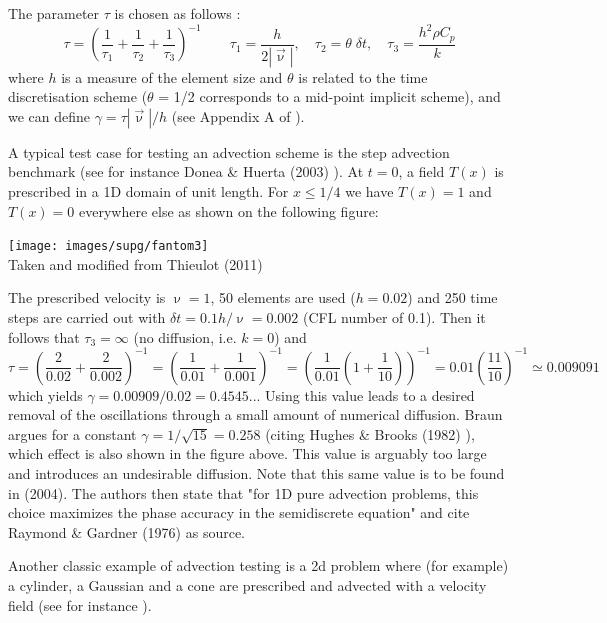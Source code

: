 The parameter $\tau$ is chosen as follows \cite{teos00}:
\begin{equation}
\tau= \left(\frac{1}{\tau_1} + \frac{1}{\tau_2} + \frac{1}{\tau_3} \right)^{-1}
\qquad
\tau_1=\frac{h}{2 |\vec\upnu|},
\quad
\tau_2 = \theta \; \delta t,
\quad
\tau_3 = \frac{h^2 \rho C_p}{k}
\label{tausupg}
\end{equation}
where $h$ is a measure of the element size and $\theta$ is related to the time
discretisation scheme ($\theta$ = 1/2 corresponds to a mid-point implicit scheme),
and we can define $\gamma=\tau |\vec\upnu|/h$ (see Appendix A of \cite{thie11}). 

A typical test case for testing an advection scheme is the step advection benchmark 
(see for instance Donea \& Huerta (2003) \cite{dohu03}). At $t=0$, 
a field $T(x)$ is prescribed in a 1D domain of unit length. For $x\le 1/4$ we have $T(x)=1$ and 
$T(x)=0$ everywhere else as shown on the following figure:
\begin{center}
\texttt{[image: images/supg/fantom3]}\\
{\captionfont Taken and modified from Thieulot (2011) \cite{thie11}}
\end{center}
The prescribed velocity is $\upnu=1$, 50 elements are used ($h=0.02$) and 250 time steps are 
carried out with $\delta t=0.1h/\upnu=0.002$ (CFL number of 0.1).
Then it follows that $\tau_3=\infty$ (no diffusion, i.e. $k=0$) and 
\[
\tau
= \left(\frac{2}{0.02} + \frac{2}{0.002} \right)^{-1}
= \left(\frac{1}{0.01} + \frac{1}{0.001} \right)^{-1}
= \left(\frac{1}{0.01} (1 + \frac{1}{10})  \right)^{-1}
= 0.01 \left(\frac{11}{10}  \right)^{-1}
\simeq 0.009091
\]
which yields $\gamma = 0.00909/0.02=0.4545...$
Using this value leads to a desired removal of the oscillations through a small
amount of numerical diffusion. Braun \cite{brau03} argues for a constant
$\gamma=1/\sqrt{15}=0.258$ (citing Hughes \& Brooks (1982) \cite{hubr82}), 
which effect is also shown in the figure above. This 
value is arguably too large and introduces an undesirable diffusion. Note that this same value is 
to be found in \textcite{bogs04} (2004). The authors then state that 
"for 1D pure advection problems, this choice maximizes the phase accuracy in the semidiscrete
equation" and cite Raymond \& Gardner (1976) \cite{raga76} as source. 

Another classic example of advection testing is a 2d problem where (for example) a cylinder, a Gaussian 
and a cone are prescribed and advected with a velocity field (see for instance \cite{dohu03}). 

